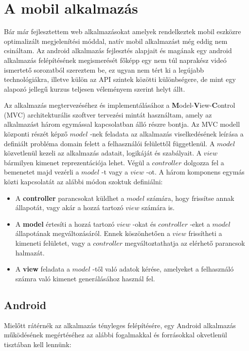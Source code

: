 \documentclass[12pt]{report}
\theoremstyle{definition}
\begin{document}
	
	\chapter{A mobil alkalmazás}
	Bár már fejlesztettem web alkalmazásokat amelyek rendelkeztek mobil eszközre optimalizált megjelenítési móddal, natív mobil alkalmazást még eddig nem csináltam. Az android alkalmazás fejlesztés alapjait és magának egy android alkalmazás felépítésének megismerését főképp egy nem túl naprakész videó ismertető sorozatból szereztem be, ez ugyan nem tért ki a legújabb technológiákra, illetve külön az API szintek közötti különbségere, de mint egy alapozó jellegű kurzus teljesen véleményem szerint helyt állt.
	
	Az alkalmazás megtervezéséhez és implementálásához a \textbf{M}odel-\textbf{V}iew-\textbf{C}ontrol (MVC) architekturális szoftver tervezési mintát használtam, amely az alkalmazást három egymással kapcsolatban álló részre bontja. Az MVC modell központi részét képző $model$ -nek feladata az alkalmazás viselkedésének leírása a definiált probléma domain felett a felhasználói felülettől függetlenül. A $model$ közvetlenül kezeli az alkalmazás adatait, logikáját és szabályait. A $view$ bármilyen kimenet reprezentációja lehet. Végül a $controller$ dolgozza fel a bemenetet majd vezérli a $model$ -t vagy a $view$ -ot. A három komponens egymás közti kapcsolatát az alábbi módon szoktuk definiálni:
	
	\begin{itemize}
		\item A \textbf{controller} parancsokat küldhet a $model$ számára, hogy frissítse annak állapotát, vagy akár a hozzá tartozó $view$ számára is.
		\item A \textbf{model} értesíti a hozzá tartozó $view$ -okat és $controller$ -eket a $model$ állapotának megváltozásáról. Ennek köszönhetően a $view$ frissítheti a kimeneti felületet, vagy a $controller$ megváltoztathatja az elérhető parancsok halmazát.
		\item A \textbf{view} feladata a $model$ -től való adatok kérése, amelyeket a felhasználó számra való kimenet generálásához használ fel.
	\end{itemize}
	
	\section{Android}
	Mielőtt rátérnék az alkalmazás tényleges felépítésére, egy Android alkalmazás működésének megértéséhez az alábbi fogalmakkal és forrásokkal okvetlenül tisztában kell lennünk:
	
\end{document}
